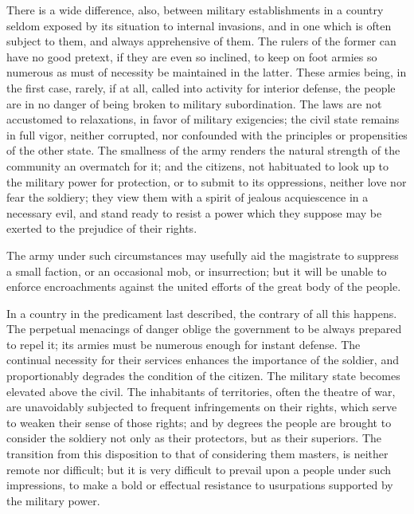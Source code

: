 There is a wide difference, also, between military establishments in a country seldom exposed by its situation to internal invasions, and in one which is often subject to them, and always apprehensive of them. 
The rulers of the former can have no good pretext, if they are even so inclined, to keep on foot armies so numerous as must of necessity be maintained in the latter. 
These armies being, in the first case, rarely, if at all, called into activity for interior defense, the people are in no danger of being broken to military subordination. 
The laws are not accustomed to relaxations, in favor of military exigencies; the civil state remains in full vigor, neither corrupted, nor confounded with the principles or propensities of the other state. 
The smallness of the army renders the natural strength of the community an overmatch for it; and the citizens, not habituated to look up to the military power for protection, or to submit to its oppressions, neither love nor fear the soldiery; they view them with a spirit of jealous acquiescence in a necessary evil, and stand ready to resist a power which they suppose may be exerted to the prejudice of their rights.

The army under such circumstances may usefully aid the magistrate to suppress a small faction, or an occasional mob, or insurrection; but it will be unable to enforce encroachments against the united efforts of the great body of the people.

In a country in the predicament last described, the contrary of all this happens. 
The perpetual menacings of danger oblige the government to be always prepared to repel it; its armies must be numerous enough for instant defense. 
The continual necessity for their services enhances the importance of the soldier, and proportionably degrades the condition of the citizen. 
The military state becomes elevated above the civil. 
The inhabitants of territories, often the theatre of war, are unavoidably subjected to frequent infringements on their rights, which serve to weaken their sense of those rights; and by degrees the people are brought to consider the soldiery not only as their protectors, but as their superiors. 
The transition from this disposition to that of considering them masters, is neither remote nor difficult; but it is very difficult to prevail upon a people under such impressions, to make a bold or effectual resistance to usurpations supported by the military power.

